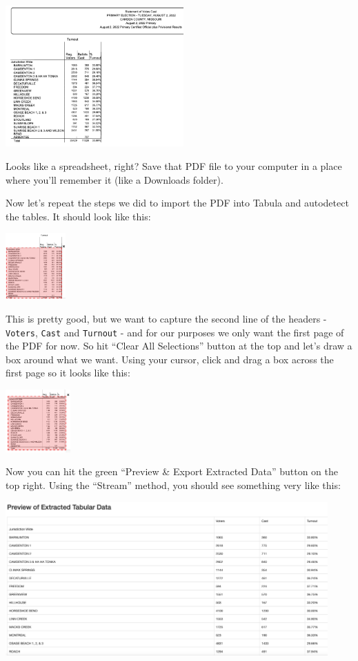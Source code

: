 \documentclass[
  letterpaper,
  DIV=11,
  numbers=noendperiod]{scrreprt}
\begin{document}
\includegraphics[width=2.69in,height=\textheight]{./images/camden_1.png}

Looks like a spreadsheet, right? Save that PDF file to your computer in
a place where you'll remember it (like a Downloads folder).

Now let's repeat the steps we did to import the PDF into Tabula and
autodetect the tables. It should look like this:

\includegraphics[width=0.91in,height=\textheight]{./images/camden_2.png}

This is pretty good, but we want to capture the second line of the
headers - \texttt{Voters}, \texttt{Cast} and \texttt{Turnout} - and for
our purposes we only want the first page of the PDF for now. So hit
``Clear All Selections'' button at the top and let's draw a box around
what we want. Using your cursor, click and drag a box across the first
page so it looks like this:

\includegraphics[width=0.98in,height=\textheight]{./images/camden_3.png}

Now you can hit the green ``Preview \& Export Extracted Data'' button on
the top right. Using the ``Stream'' method, you should see something
very like this:

\includegraphics[width=4.86in,height=\textheight]{./images/camden_4.png}
\end{document}
